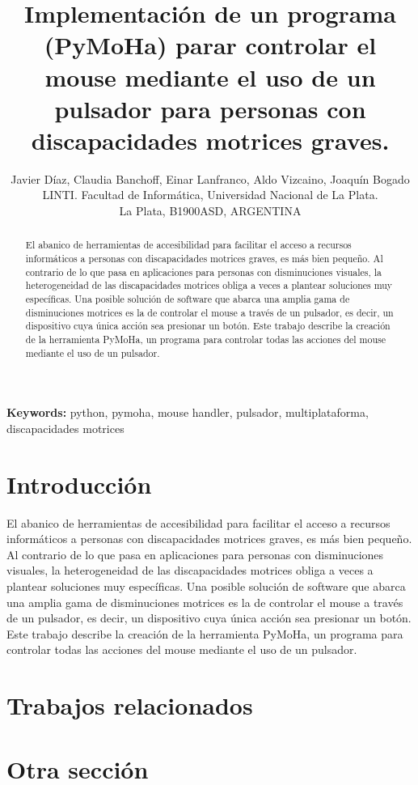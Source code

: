 \documentclass[final,narroweqnarray,inline,twoside]{ieee}
\author{Javier Díaz, Claudia Banchoff, Einar Lanfranco, Aldo Vizcaino, Joaquín Bogado
\\LINTI. Facultad de Informática, Universidad Nacional de La Plata.
\\La Plata, B1900ASD, ARGENTINA
}
\title{Implementación de un programa (PyMoHa) parar controlar el mouse mediante el uso de un pulsador para personas con discapacidades motrices graves.}
\begin{document}
\maketitle
\sloppy

\begin{abstract}
El abanico de herramientas de accesibilidad para facilitar el acceso a recursos informáticos a personas con discapacidades
motrices graves, es más bien pequeño. Al contrario de lo que pasa en aplicaciones para personas con disminuciones visuales,
la heterogeneidad de las discapacidades motrices obliga a veces a plantear soluciones muy específicas.
Una posible solución de software que abarca una amplia gama de disminuciones motrices es la de controlar el mouse a
través de un pulsador, es decir, un dispositivo cuya única acción sea presionar un botón. Este trabajo describe la creación
de la herramienta PyMoHa, un programa para controlar todas las acciones del mouse mediante el uso de un pulsador.
\end{abstract}

\noindent \textbf{Keywords: } python, pymoha, mouse handler, pulsador, multiplataforma, discapacidades motrices

\section{Introducción}
El abanico de herramientas de accesibilidad para facilitar el acceso a recursos informáticos a personas con discapacidades
motrices graves, es más bien pequeño. Al contrario de lo que pasa en aplicaciones para personas con disminuciones visuales,
la heterogeneidad de las discapacidades motrices obliga a veces a plantear soluciones muy específicas.
Una posible solución de software que abarca una amplia gama de disminuciones motrices es la de controlar el mouse a
través de un pulsador, es decir, un dispositivo cuya única acción sea presionar un botón. Este trabajo describe la creación
de la herramienta PyMoHa, un programa para controlar todas las acciones del mouse mediante el uso de un pulsador. 
\section{Trabajos relacionados}

\section{Otra sección}
\end{document}
